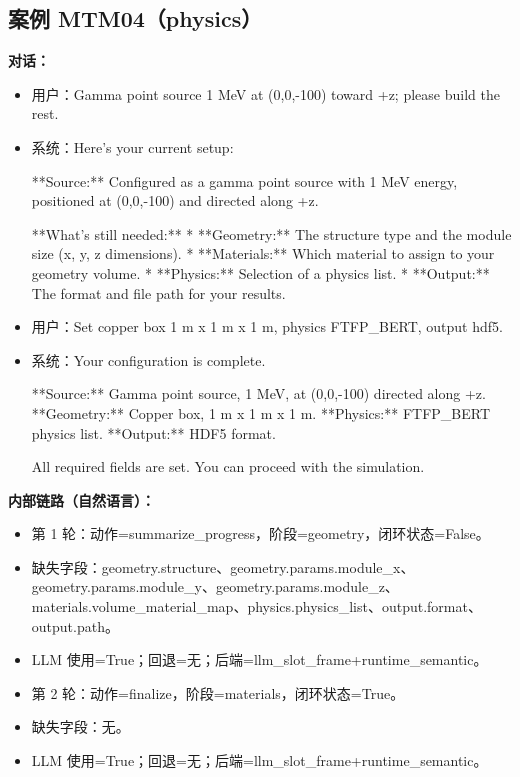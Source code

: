 \documentclass[11pt]{ctexart}
\begin{document}
\subsection{案例 MTM04（physics）}
\textbf{对话：}
\begin{itemize}
\item 用户：Gamma point source 1 MeV at (0,0,-100) toward +z; please build the rest.
\item 系统：Here's your current setup:

**Source:** Configured as a gamma point source with 1 MeV energy, positioned at (0,0,-100) and directed along +z.

**What's still needed:**
*   **Geometry:** The structure type and the module size (x, y, z dimensions).
*   **Materials:** Which material to assign to your geometry volume.
*   **Physics:** Selection of a physics list.
*   **Output:** The format and file path for your results.
\item 用户：Set copper box 1 m x 1 m x 1 m, physics FTFP\_BERT, output hdf5.
\item 系统：Your configuration is complete.

**Source:** Gamma point source, 1 MeV, at (0,0,-100) directed along +z.
**Geometry:** Copper box, 1 m x 1 m x 1 m.
**Physics:** FTFP\_BERT physics list.
**Output:** HDF5 format.

All required fields are set. You can proceed with the simulation.
\end{itemize}
\textbf{内部链路（自然语言）：}
\begin{itemize}
\item 第 1 轮：动作=summarize\_progress，阶段=geometry，闭环状态=False。
\item 缺失字段：geometry.structure、geometry.params.module\_x、geometry.params.module\_y、geometry.params.module\_z、materials.volume\_material\_map、physics.physics\_list、output.format、output.path。
\item LLM 使用=True；回退=无；后端=llm\_slot\_frame+runtime\_semantic。
\item 第 2 轮：动作=finalize，阶段=materials，闭环状态=True。
\item 缺失字段：无。
\item LLM 使用=True；回退=无；后端=llm\_slot\_frame+runtime\_semantic。
\end{itemize}
\end{document}
